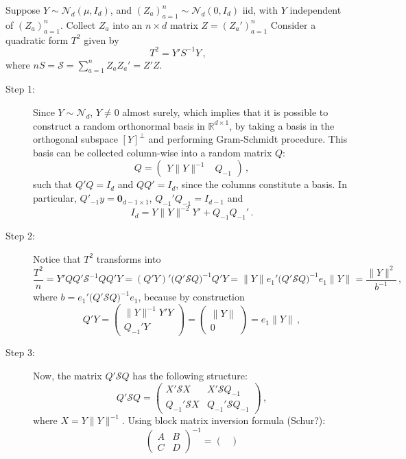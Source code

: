\documentclass[a4paper,14pt]{article}
\newcommand{\nil}{\mathbf{0}}
\newcommand{\Ncal}{\mathcal{N}}
\newcommand{\Scal}{\mathcal{S}}
\newcommand{\Real}{\mathbb{R}}
\begin{document}
Suppose $Y\sim \Ncal_d(\mu, I_d)$, and $(Z_a)_{a=1}^n \sim \Ncal_d(0, I_d)$ iid,
with $Y$ independent of $(Z_a)_{a=1}^n$. Collect $Z_a$ into an $n\times d$ matrix
$Z = (Z_a')_{a=1}^n$ Consider a quadratic form $T^2$ given by
$$ T^2 = Y' S^{-1} Y \,, $$
where $n S = \Scal = \sum_{a=1}^n Z_aZ_a' = Z'Z$.
\begin{description}
    \item[Step 1:] Since $Y\sim \Ncal_d$, $Y\neq 0$ almost surely, which implies that
    it is possible to construct a random orthonormal basis in $\Real^{d\times 1}$,
    by taking a basis in the orthogonal subspace $[Y]^\perp$ and performing Gram-Schmidt
    procedure. This basis can be collected column-wise into a random matrix $Q$:
    $$ Q = \begin{pmatrix} Y \|Y\|^{-1} & Q_{-1} \end{pmatrix}\,, $$
    such that $Q' Q = I_d$ and $Q Q' = I_d$, since the columns constitute a basis.
    In particular, $Q'_{-1} y = \nil_{d-1\times 1}$, $Q_{-1}'Q_{-1}=I_{d-1}$ and
    $$ I_d = Y \|Y\|^{-2} Y' + Q_{-1}Q_{-1}'\,. $$
    \item[Step 2:] Notice that $T^2$ transforms into
    $$ \frac{T^2}{n}
        = Y'Q Q' \Scal^{-1} Q Q'Y
        = (Q'Y)' \bigl(Q' \Scal Q\bigr)^{-1} Q'Y
        = \|Y\| e_1'\bigl(Q'\Scal Q\bigr)^{-1}e_1 \|Y\|
        = \frac{\|Y\|^2}{b^{-1}}
        \,, $$
    where $b = e_1' \bigl(Q' \Scal Q\bigr)^{-1} e_1$, because by construction
    $$ Q'Y
        = \begin{pmatrix} \|Y\|^{-1} Y'Y \\ Q_{-1}'Y \end{pmatrix}
        = \begin{pmatrix} \|Y\| \\ 0 \end{pmatrix}
        = e_1\|Y\|
        \,, $$
    \item[Step 3:] Now, the matrix $Q' \Scal Q$ has the following structure:
    $$ Q' \Scal Q
        = \begin{pmatrix}
            X' \Scal X & X' \Scal Q_{-1} \\
            Q_{-1}' \Scal X & Q_{-1}' \Scal Q_{-1}
        \end{pmatrix}
        \,,$$
    where $X = Y \|Y\|^{-1}$. Using block matrix inversion formula (Schur?):
    $$ \begin{pmatrix}
        A & B \\ C & D
    \end{pmatrix}^{-1}
        = \begin{pmatrix}

\end{pmatrix}$$
\end{description}
\end{document}
